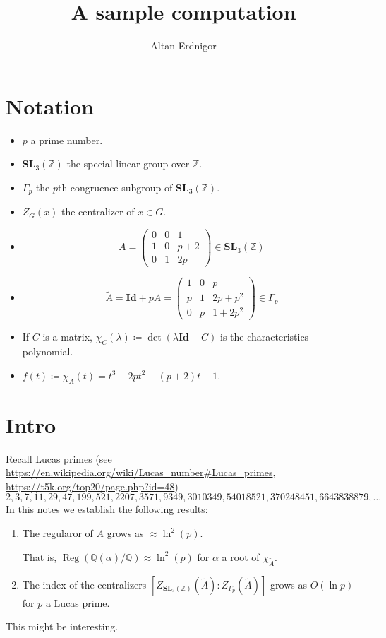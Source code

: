 \documentclass[a4paper]{article}
\DeclareMathOperator{\assign}{\coloneqq}        %
\newcommand{\Q}{\mathbb{Q}}        %
\newcommand{\Id}{\mathbf{Id}}        %
\newcommand{\SL}{\mathbf{SL}_3(\mathbb{Z})}        %
\newcommand{\SLp}{\Gamma_p}        %
\DeclareMathOperator{\Reg}{Reg}        %
\begin{document}
\title{A sample computation}	
\author{Altan Erdnigor}
\maketitle

\section{Notation}
\begin{itemize}
\item $p$ a prime number.
\item $\SL$ the special linear group over $\mathbb{Z}$.
\item $\SLp$ the $p$th congruence subgroup of $\SL$.
\item $Z_G(x)$ the centralizer of $x \in G$.
\item 
\begin{equation}
\label{matrix_small}
A = 
\begin{pmatrix}
0 & 0 & 1 \\
1 & 0 & p+2 \\
0 & 1 & 2p
\end{pmatrix}
\in \SL
\end{equation}
\item 
\begin{equation}
\label{matrix_big}
\tilde A = \Id + p A =
\begin{pmatrix}
1 & 0 & p \\
p & 1 & 2 p + p^2 \\
0 & p & 1 + 2 p^2
\end{pmatrix}
\in \SLp
\end{equation}

\item If $C$ is a matrix, $\chi_C(\lambda) \assign \det(\lambda \Id - C)$ is the characteristics polynomial.
\item $ f(t) \assign \chi_A(t) = t^3 - 2p t^2 - (p + 2) t - 1$.

\end{itemize}

\section{Intro}
Recall Lucas primes (see \url{https://en.wikipedia.org/wiki/Lucas_number#Lucas_primes}, \url{https://t5k.org/top20/page.php?id=48})
\begin{equation}
	\label{the_primes_sequence}
2, 3, 7, 11, 29, 47, 199, 521, 2207, 3571, 9349, 3010349, 54018521, 370248451, 6643838879, \ldots
\end{equation}
In this notes we establish the following results:
\begin{enumerate}
\item
The regularor of $\tilde A$
grows as $\approx \ln^2(p)$. 

That is, $\Reg ( \Q(\alpha)/\Q ) \approx \ln^2(p) $ for $\alpha$ a root of $\chi_{\tilde A}$.

\item
The index of the centralizers
$ [Z_{\SL}(\tilde A) : Z_{\SLp}(\tilde A)] $
grows as $O(\ln p)$ for $p$ a Lucas prime.
\end{enumerate}
This might be interesting.
\end{document}
